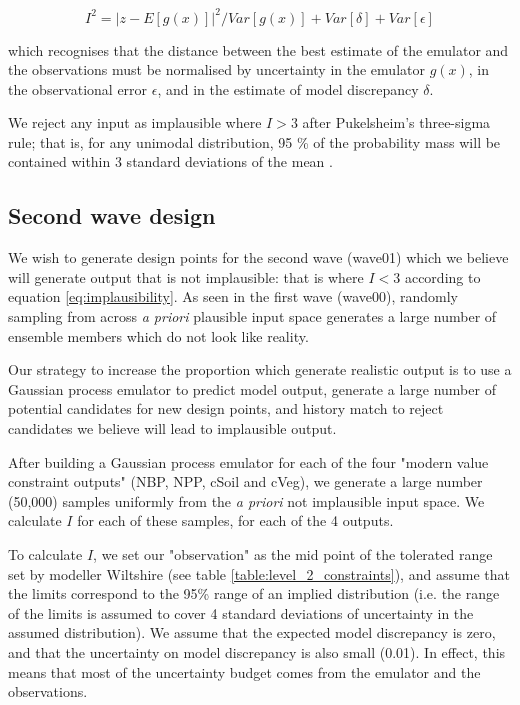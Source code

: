 \documentclass[gmd, manuscript]{copernicus}
\begin{document}
\begin{equation}\label{eq:implausibility}
I^{2} = {\lvert  z - E[g(x)]\rvert}^{2} /  Var[g(x)] + Var[\delta] +  Var[\epsilon]
\end{equation}

which recognises that the distance between the best estimate of the emulator and the observations must be normalised by uncertainty in the emulator $g(x)$, in the observational error $\epsilon$, and in the estimate of model discrepancy $\delta$. 

We reject any input as implausible where $I >3$ after Pukelsheim's three-sigma rule; that is, for any unimodal distribution, 95 \% of the probability mass will be contained within 3 standard deviations of the mean \citep{pukelsheim1994three}.

\subsection{Second wave design}\label{ssec:second_wave_design}

We wish to generate design points for the second wave (wave01) which we believe will generate output that is not implausible: that is where $I<3$ according to equation \ref{eq:implausibility}. As seen in the first wave (wave00), randomly sampling from across \emph{a priori} plausible input space generates a large number of ensemble members which do not look like reality.

Our strategy to increase the proportion which generate realistic output is to use a Gaussian process emulator to predict model output, generate a large number of potential candidates for new design points, and history match to reject candidates we believe will lead to implausible output.

After building a Gaussian process emulator for each of the four "modern value constraint outputs" (NBP, NPP, cSoil and cVeg), we generate a large number (50,000) samples uniformly from the \emph{a priori} not implausible input space. We calculate $I$ for each of these samples, for each of the 4 outputs. 

To calculate $I$, we set our "observation" as the mid point of the tolerated range set by modeller Wiltshire (see table \ref{table:level_2_constraints}), and assume that the limits correspond to the 95\% range of an implied distribution (i.e. the range of the limits is assumed to cover 4 standard deviations of uncertainty in the assumed distribution). We assume that the expected model discrepancy is zero, and that the uncertainty on model discrepancy is also small (0.01). In effect, this means that most of the uncertainty budget comes from the emulator and the observations.
\end{document}
